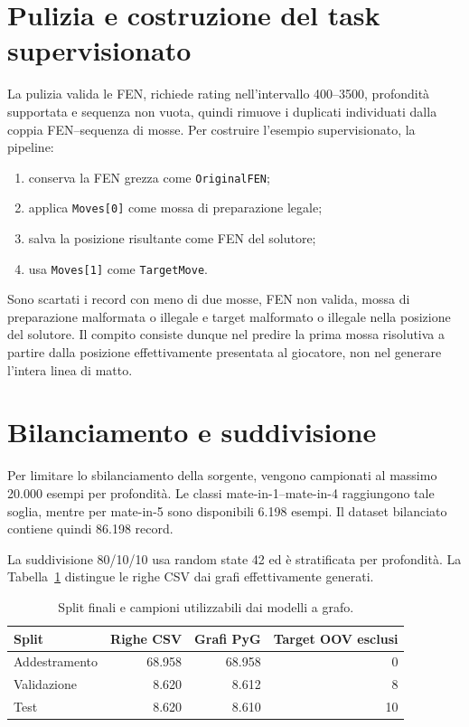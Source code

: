 \section{Pulizia e costruzione del task supervisionato}

La pulizia valida le FEN, richiede rating nell'intervallo 400--3500, profondità
supportata e sequenza non vuota, quindi rimuove i duplicati individuati dalla coppia
FEN--sequenza di mosse. Per costruire l'esempio supervisionato, la pipeline:

\begin{enumerate}
    \item conserva la FEN grezza come \texttt{OriginalFEN};
    \item applica \texttt{Moves[0]} come mossa di preparazione legale;
    \item salva la posizione risultante come FEN del solutore;
    \item usa \texttt{Moves[1]} come \texttt{TargetMove}.
\end{enumerate}

Sono scartati i record con meno di due mosse, FEN non valida, mossa di preparazione
malformata o illegale e target malformato o illegale nella posizione del solutore.
Il compito consiste dunque nel predire la prima mossa risolutiva a partire dalla
posizione effettivamente presentata al giocatore, non nel generare l'intera linea
di matto.

\section{Bilanciamento e suddivisione}

Per limitare lo sbilanciamento della sorgente, vengono campionati al massimo 20.000
esempi per profondità. Le classi mate-in-1--mate-in-4 raggiungono tale soglia,
mentre per mate-in-5 sono disponibili 6.198 esempi. Il dataset bilanciato contiene
quindi 86.198 record.

La suddivisione 80/10/10 usa random state 42 ed è stratificata per profondità. La
Tabella~\ref{tab:main-dataset-splits} distingue le righe CSV dai grafi
effettivamente generati.

\begin{table}[htbp]
    \centering
    \small
    \caption{Split finali e campioni utilizzabili dai modelli a grafo.}
    \label{tab:main-dataset-splits}
    \begin{tabular}{lrrr}
        \toprule
        Split & Righe CSV & Grafi PyG & Target OOV esclusi \\
        \midrule
        Addestramento & 68.958 & 68.958 & 0 \\
        Validazione   & 8.620  & 8.612  & 8 \\
        Test          & 8.620  & 8.610  & 10 \\
        \bottomrule
    \end{tabular}
\end{table}

